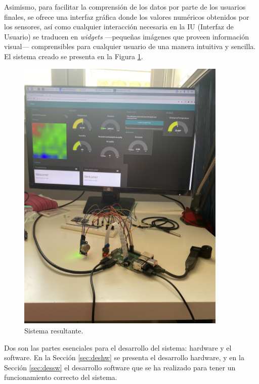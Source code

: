 Asimismo, para facilitar la comprensión de los datos por parte de los usuarios finales, se ofrece una interfaz gráfica donde los valores numéricos obtenidos por los sensores, así como cualquier interacción necesaria en la IU (Interfaz de Usuario) se traducen en \textit{widgets} ---pequeñas imágenes que proveen información visual--- comprensibles para cualquier usuario de una manera intuitiva y sencilla. El sistema creado se presenta en la Figura \ref{fig:misistema}.\\
\begin{figure} [h!]
  \begin{center}
    \includegraphics[width=10cm]{figs/misistema}
  \end{center}
  \caption{Sistema resultante.}
  \label{fig:misistema}
\end{figure}

Dos son las partes esenciales para el desarrollo del sistema: hardware y el software. En la Sección \ref{sec:deshw} se presenta el desarrollo hardware, y en la Sección \ref{sec:dessw} el desarrollo software que se ha realizado para tener un funcionamiento correcto del sistema.

